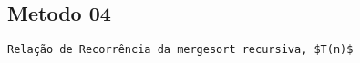 \subsection{Metodo 04}
\begin{verbatim}
Relação de Recorrência da mergesort recursiva, $T(n)$
\end{verbatim}
